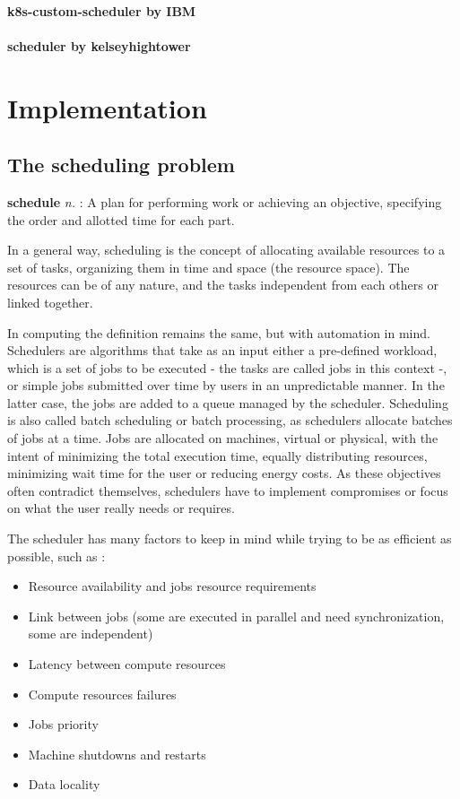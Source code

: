 \documentclass[12pt, a4paper]{memoir}
\begin{document}
\subsubsection*{k8s-custom-scheduler by IBM}
\subsubsection*{scheduler by kelseyhightower}

\chapter{Implementation}
\section{The scheduling problem}
\begin{displayquote}[][]
	\textbf{schedule} \textit{n.} : A plan for
	performing work or achieving an objective, specifying the order and
	allotted time for each part.
\end{displayquote}

In a general way, scheduling is the concept of allocating available resources
to a set of tasks, organizing them in time and space (the resource space). The
resources can be of any nature, and the tasks independent from each others or
linked together.

In computing the definition remains the same, but with automation in mind.
Schedulers are algorithms that take as an input either a pre-defined workload,
which is a set of jobs  to be executed - the tasks are called jobs in this
context -, or simple jobs submitted over time by users in an unpredictable
manner. In the latter case, the jobs are added to a queue managed by the
scheduler. Scheduling is also called batch scheduling or batch processing, as
schedulers allocate batches of jobs at a time. Jobs are allocated on machines,
virtual or physical, with the intent of minimizing the total execution time,
equally distributing resources, minimizing wait time for the user or reducing
energy costs. As these objectives often contradict themselves, schedulers have
to implement compromises or focus on what the user really needs or requires.  

The scheduler has many factors to keep in mind while trying to be as efficient
as possible, such as :

\begin{itemize}
	\item Resource availability and jobs resource requirements
	\item Link between jobs (some are executed in parallel and need synchronization, some are independent)
	\item Latency between compute resources
	\item Compute resources failures
	\item Jobs priority
	\item Machine shutdowns and restarts
	\item Data locality
\end{itemize}
\end{document}
